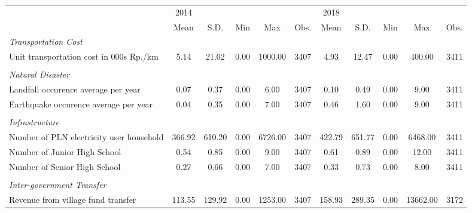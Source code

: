 \begin{tabular}{l*{2}{ccccc}}
\toprule
                &     2014&         &         &         &         &     2018&         &         &         &         \\
                &     Mean&     S.D.&      Min&      Max&     Obs.&     Mean&     S.D.&      Min&      Max&     Obs.\\
\midrule
\emph{Transportation Cost}&         &         &         &         &         &         &         &         &         &         \\
\hspace{0.25cm} Unit transportation cost in 000s Rp./km&     5.14&    21.02&     0.00&  1000.00&     3407&     4.93&    12.47&     0.00&   400.00&     3411\\
\vspace{0.05em} \\ \emph{Natural Disaster}&         &         &         &         &         &         &         &         &         &         \\
\hspace{0.25cm} Landfall occurence average per year&     0.07&     0.37&     0.00&     6.00&     3407&     0.10&     0.49&     0.00&     9.00&     3411\\
\hspace{0.25cm} Earthquake occurence average per year&     0.04&     0.35&     0.00&     7.00&     3407&     0.46&     1.60&     0.00&     9.00&     3411\\
\vspace{0.05em} \\ \emph{Infrastructure}&         &         &         &         &         &         &         &         &         &         \\
\hspace{0.25cm} Number of PLN electricity user household&   366.92&   610.20&     0.00&  6726.00&     3407&   422.79&   651.77&     0.00&  6468.00&     3411\\
\hspace{0.25cm} Number of Junior High School&     0.54&     0.85&     0.00&     9.00&     3407&     0.61&     0.89&     0.00&    12.00&     3411\\
\hspace{0.25cm} Number of Senior High School&     0.27&     0.66&     0.00&     7.00&     3407&     0.33&     0.73&     0.00&     8.00&     3411\\
\vspace{0.05em} \\ \emph{Inter-government Transfer}&         &         &         &         &         &         &         &         &         &         \\
\hspace{0.25cm} Revenue from village fund transfer&   113.55&   129.92&     0.00&  1253.00&     3407&   158.93&   289.35&     0.00& 13662.00&     3172\\
\bottomrule
\end{tabular}
